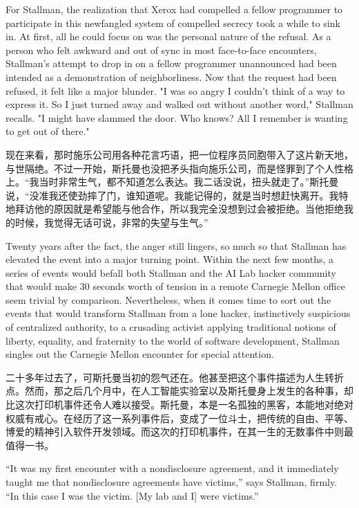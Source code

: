 \ifdefined\eng
For Stallman, the realization that Xerox had compelled a fellow programmer to participate in this newfangled system of compelled secrecy took a while to sink in. At first, all he could focus on was the personal nature of the refusal. As a person who felt awkward and out of sync in most face-to-face encounters, Stallman's attempt to drop in on a fellow programmer unannounced had been intended as a demonstration of neighborliness. Now that the request had been refused, it felt like a major blunder. "I was so angry I couldn't think of a way to express it. So I just turned away and walked out without another word," Stallman recalls. "I might have slammed the door. Who knows? All I remember is wanting to get out of there."
\fi

\ifdefined\chs
现在来看，那时施乐公司用各种花言巧语，把一位程序员同胞带入了这片新天地，与世隔绝。不过一开始，斯托曼也没把矛头指向施乐公司，而是怪罪到了个人性格上。``我当时非常生气，都不知道怎么表达。我二话没说，扭头就走了。''斯托曼说，``没准我还使劲摔了门，谁知道呢。我能记得的，就是当时想赶快离开。我特地拜访他的原因就是希望能与他合作，所以我完全没想到过会被拒绝。当他拒绝我的时候，我觉得无话可说，非常的失望与生气。''
\fi

\ifdefined\eng
Twenty years after the fact, the anger still lingers, so much so that Stallman has elevated the event into a major turning point. Within the next few months, a series of events would befall both Stallman and the AI Lab hacker community that would make 30 seconds worth of tension in a remote Carnegie Mellon office seem trivial by comparison. Nevertheless, when it comes time to sort out the events that would transform Stallman from a lone hacker, instinctively suspicious of centralized authority, to a crusading activist applying traditional notions of liberty, equality, and fraternity to the world of software development, Stallman singles out the Carnegie Mellon encounter for special attention.
\fi

\ifdefined\chs
二十多年过去了，可斯托曼当初的怨气还在。他甚至把这个事件描述为人生转折点。然而，那之后几个月中，在人工智能实验室以及斯托曼身上发生的各种事，却比这次打印机事件还令人难以接受。斯托曼，本是一名孤独的黑客，本能地对绝对权威有戒心。在经历了这一系列事件后，变成了一位斗士，把传统的自由、平等、博爱的精神引入软件开发领域。而这次的打印机事件，在其一生的无数事件中则最值得一书。
\fi

\ifdefined\eng
``It was my first encounter with a nondisclosure agreement, and it immediately taught me that nondisclosure agreements have victims,'' says Stallman, firmly. ``In this case I was the victim. [My lab and I] were victims.''
\fi

